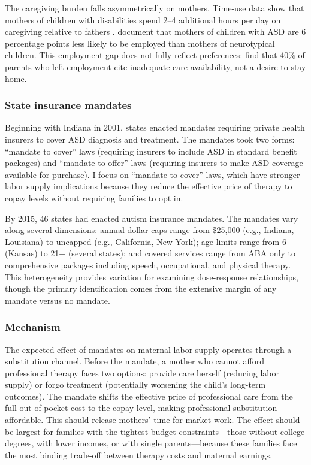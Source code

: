 \documentclass[12pt]{article}
\begin{document}
The caregiving burden falls asymmetrically on mothers. Time-use data show that mothers of children with disabilities spend 2--4 additional hours per day on caregiving relative to fathers \citep{currie2007}. \citet{cidav2012} document that mothers of children with ASD are 6 percentage points less likely to be employed than mothers of neurotypical children. This employment gap does not fully reflect preferences: \citet{deRigne2012} find that 40\% of parents who left employment cite inadequate care availability, not a desire to stay home.

\subsubsection*{State insurance mandates}  Beginning with Indiana in 2001, states enacted mandates requiring private health insurers to cover ASD diagnosis and treatment. The mandates took two forms: ``mandate to cover'' laws (requiring insurers to include ASD in standard benefit packages) and ``mandate to offer'' laws (requiring insurers to make ASD coverage available for purchase). I focus on ``mandate to cover'' laws, which have stronger labor supply implications because they reduce the effective price of therapy to copay levels without requiring families to opt in.

By 2015, 46 states had enacted autism insurance mandates. The mandates vary along several dimensions: annual dollar caps range from \$25,000 (e.g., Indiana, Louisiana) to uncapped (e.g., California, New York); age limits range from 6 (Kansas) to 21+ (several states); and covered services range from ABA only to comprehensive packages including speech, occupational, and physical therapy. This heterogeneity provides variation for examining dose-response relationships, though the primary identification comes from the extensive margin of any mandate versus no mandate.

\subsubsection*{Mechanism}  The expected effect of mandates on maternal labor supply operates through a substitution channel. Before the mandate, a mother who cannot afford professional therapy faces two options: provide care herself (reducing labor supply) or forgo treatment (potentially worsening the child's long-term outcomes). The mandate shifts the effective price of professional care from the full out-of-pocket cost to the copay level, making professional substitution affordable. This should release mothers' time for market work. The effect should be largest for families with the tightest budget constraints---those without college degrees, with lower incomes, or with single parents---because these families face the most binding trade-off between therapy costs and maternal earnings.
\end{document}
